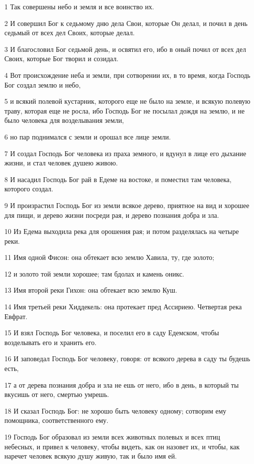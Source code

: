 \par 1 Так совершены небо и земля и все воинство их.
\par 2 И совершил Бог к седьмому дню дела Свои, которые Он делал, и почил в день седьмый от всех дел Своих, которые делал.
\par 3 И благословил Бог седьмой день, и освятил его, ибо в оный почил от всех дел Своих, которые Бог творил и созидал.
\par 4 Вот происхождение неба и земли, при сотворении их, в то время, когда Господь Бог создал землю и небо,
\par 5 и всякий полевой кустарник, которого еще не было на земле, и всякую полевую траву, которая еще не росла, ибо Господь Бог не посылал дождя на землю, и не было человека для возделывания земли,
\par 6 но пар поднимался с земли и орошал все лице земли.
\par 7 И создал Господь Бог человека из праха земного, и вдунул в лице его дыхание жизни, и стал человек душею живою.
\par 8 И насадил Господь Бог рай в Едеме на востоке, и поместил там человека, которого создал.
\par 9 И произрастил Господь Бог из земли всякое дерево, приятное на вид и хорошее для пищи, и дерево жизни посреди рая, и дерево познания добра и зла.
\par 10 Из Едема выходила река для орошения рая; и потом разделялась на четыре реки.
\par 11 Имя одной Фисон: она обтекает всю землю Хавила, ту, где золото;
\par 12 и золото той земли хорошее; там бдолах и камень оникс.
\par 13 Имя второй реки Гихон: она обтекает всю землю Куш.
\par 14 Имя третьей реки Хиддекель: она протекает пред Ассириею. Четвертая река Евфрат.
\par 15 И взял Господь Бог человека, и поселил его в саду Едемском, чтобы возделывать его и хранить его.
\par 16 И заповедал Господь Бог человеку, говоря: от всякого дерева в саду ты будешь есть,
\par 17 а от дерева познания добра и зла не ешь от него, ибо в день, в который ты вкусишь от него, смертью умрешь.
\par 18 И сказал Господь Бог: не хорошо быть человеку одному; сотворим ему помощника, соответственного ему.
\par 19 Господь Бог образовал из земли всех животных полевых и всех птиц небесных, и привел к человеку, чтобы видеть, как он назовет их, и чтобы, как наречет человек всякую душу живую, так и было имя ей.
